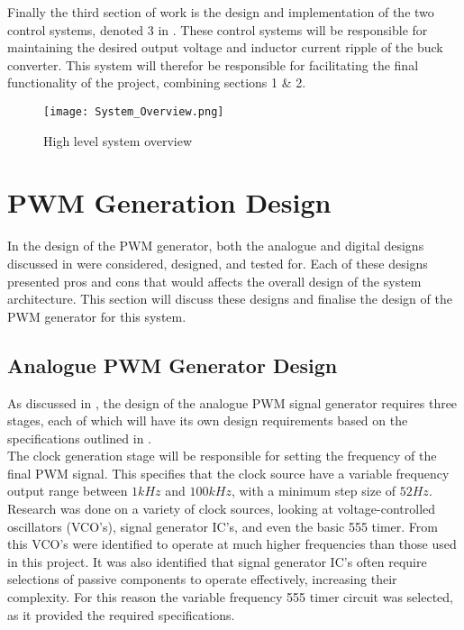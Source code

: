 Finally the third section of work is the design and implementation of the two control systems, denoted 3 in . These control systems will be responsible for maintaining the desired output voltage and inductor current ripple of the buck converter. This system will therefor be responsible for facilitating the final functionality of the project, combining sections 1 \& 2. \\

\begin{figure}[!h]
    \texttt{[image: System\_Overview.png]}
    \caption{High level system overview}
    \vspace{-20pt}
    \label{F:sys_overview}
\end{figure}

\section{PWM Generation Design}\label{S:pwm_gen}

In the design of the PWM generator, both the analogue and digital designs discussed in  were considered, designed, and tested for. Each of these designs presented pros and cons that would affects the overall design of the system architecture. This section will discuss these designs and finalise the design of the PWM generator for this system. 

\subsection{Analogue PWM Generator Design}\label{S:analogue_design}

As discussed in , the design of the analogue PWM signal generator requires three stages, each of which will have its own design requirements based on the specifications outlined in . \\

The clock generation stage will be responsible for setting the frequency of the final PWM signal. This specifies that the clock source have a variable frequency output range between $1kHz$ and $100kHz$, with a minimum step size of $52Hz$. Research was done on a variety of clock sources, looking at voltage-controlled oscillators (VCO's), signal generator IC's, and even the basic 555 timer. From this VCO's were identified to operate at much higher frequencies than those used in this project. It was also identified that signal generator IC's often require selections of passive components to operate effectively, increasing their complexity. For this reason the variable frequency 555 timer circuit was selected, as it provided the required specifications.\\

